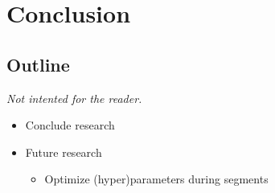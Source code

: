 
\chapter{Conclusion}

\label{Chapter7} %


\section{Outline}
\emph{Not intented for the reader.}
\begin{itemize}
  \item Conclude research
  \item Future research
  \begin{itemize}
    \item Optimize (hyper)parameters during segments
  \end{itemize}
\end{itemize}